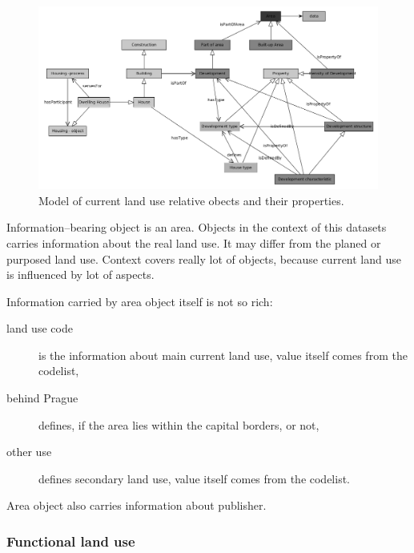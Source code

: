 \documentclass{lncs-template/llncs}
\begin{document}
\begin{figure}
 \includegraphics[width=1.0\textwidth]{images/SSVU.png}
 \caption{Model of current land use relative obects and their properties.}\label{fig:dat_clu}
\end{figure}

Information--bearing object is an area. Objects in the context of this datasets carries information about the real land use. It may differ from the planed or purposed land use. Context covers really lot of objects, because current land use is influenced by lot of aspects.

Information carried by area object itself is not so rich:
\begin{description}
\item[land use code] is the information about main current land use, value itself comes from the codelist,
\item[behind Prague] defines, if the area lies within the capital borders, or not,
\item[other use] defines secondary land use, value itself comes from the codelist.
\end{description}
Area object also carries information about publisher.

\subsubsection{Functional land use}

\end{document}
